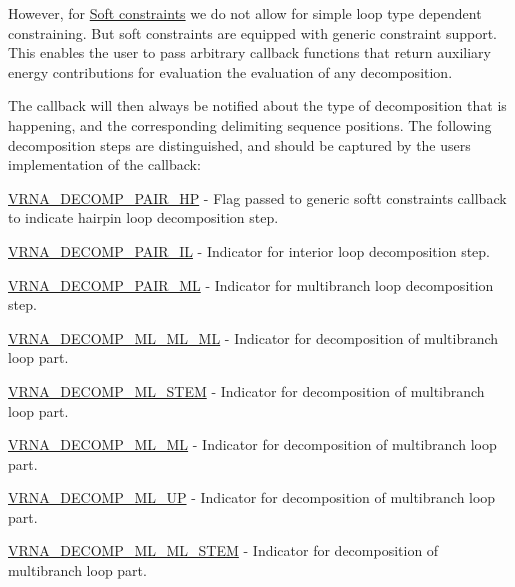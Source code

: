 However, for \hyperlink{group__soft__constraints}{Soft constraints} we do not allow for simple loop type dependent constraining. But soft constraints are equipped with generic constraint support. This enables the user to pass arbitrary callback functions that return auxiliary energy contributions for evaluation the evaluation of any decomposition.

The callback will then always be notified about the type of decomposition that is happening, and the corresponding delimiting sequence positions. The following decomposition steps are distinguished, and should be captured by the user\textquotesingle{}s implementation of the callback\+:


\begin{DoxyItemize}
\item \hyperlink{group__constraints_ga8bd41ebc8039378d242e4e8c273716a5}{V\+R\+N\+A\+\_\+\+D\+E\+C\+O\+M\+P\+\_\+\+P\+A\+I\+R\+\_\+\+HP} -\/ Flag passed to generic softt constraints callback to indicate hairpin loop decomposition step.
\item \hyperlink{group__constraints_gaeab04f34d7730cff2d651d782f95d857}{V\+R\+N\+A\+\_\+\+D\+E\+C\+O\+M\+P\+\_\+\+P\+A\+I\+R\+\_\+\+IL} -\/ Indicator for interior loop decomposition step.
\item \hyperlink{group__constraints_gaa15b1185673f0b9e900c4748d45f388f}{V\+R\+N\+A\+\_\+\+D\+E\+C\+O\+M\+P\+\_\+\+P\+A\+I\+R\+\_\+\+ML} -\/ Indicator for multibranch loop decomposition step.
\item \hyperlink{group__constraints_ga735517266f2e35e1374b8f1ea77ef23e}{V\+R\+N\+A\+\_\+\+D\+E\+C\+O\+M\+P\+\_\+\+M\+L\+\_\+\+M\+L\+\_\+\+ML} -\/ Indicator for decomposition of multibranch loop part.
\item \hyperlink{group__constraints_ga4a23054c75d8efc785de50e3ea87602f}{V\+R\+N\+A\+\_\+\+D\+E\+C\+O\+M\+P\+\_\+\+M\+L\+\_\+\+S\+T\+EM} -\/ Indicator for decomposition of multibranch loop part.
\item \hyperlink{group__constraints_ga7f4cb9ff7a33e67f0539bd39e7b19a78}{V\+R\+N\+A\+\_\+\+D\+E\+C\+O\+M\+P\+\_\+\+M\+L\+\_\+\+ML} -\/ Indicator for decomposition of multibranch loop part.
\item \hyperlink{group__constraints_gae6478dda14e50e2f2cb9ef333a29256e}{V\+R\+N\+A\+\_\+\+D\+E\+C\+O\+M\+P\+\_\+\+M\+L\+\_\+\+UP} -\/ Indicator for decomposition of multibranch loop part.
\item \hyperlink{group__constraints_ga63d8ceb8c96ae3b463e529e28cc0fe98}{V\+R\+N\+A\+\_\+\+D\+E\+C\+O\+M\+P\+\_\+\+M\+L\+\_\+\+M\+L\+\_\+\+S\+T\+EM} -\/ Indicator for decomposition of multibranch loop part.

\end{DoxyItemize}
